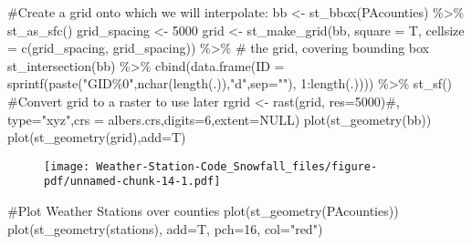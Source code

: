 \documentclass[
  letterpaper,
]{book}
\newenvironment{Shaded}{\begin{snugshade}}{\end{snugshade}}
\newcommand{\AttributeTok}[1]{\textcolor[rgb]{0.40,0.45,0.13}{#1}}
\newcommand{\CommentTok}[1]{\textcolor[rgb]{0.37,0.37,0.37}{#1}}
\newcommand{\DecValTok}[1]{\textcolor[rgb]{0.68,0.00,0.00}{#1}}
\newcommand{\FunctionTok}[1]{\textcolor[rgb]{0.28,0.35,0.67}{#1}}
\newcommand{\NormalTok}[1]{\textcolor[rgb]{0.00,0.23,0.31}{#1}}
\newcommand{\OtherTok}[1]{\textcolor[rgb]{0.00,0.23,0.31}{#1}}
\newcommand{\SpecialCharTok}[1]{\textcolor[rgb]{0.37,0.37,0.37}{#1}}
\newcommand{\StringTok}[1]{\textcolor[rgb]{0.13,0.47,0.30}{#1}}
\begin{document}
\begin{Shaded}
\begin{Highlighting}[]
\CommentTok{\#Create a grid onto which we will interpolate:}
\NormalTok{bb }\OtherTok{\textless{}{-}} \FunctionTok{st\_bbox}\NormalTok{(PAcounties) }\SpecialCharTok{\%\textgreater{}\%} \FunctionTok{st\_as\_sfc}\NormalTok{()}
\NormalTok{grid\_spacing }\OtherTok{\textless{}{-}} \DecValTok{5000}
\NormalTok{grid }\OtherTok{\textless{}{-}} \FunctionTok{st\_make\_grid}\NormalTok{(bb, }\AttributeTok{square =}\NormalTok{ T, }\AttributeTok{cellsize =} \FunctionTok{c}\NormalTok{(grid\_spacing, grid\_spacing)) }\SpecialCharTok{\%\textgreater{}\%} \CommentTok{\# the grid, covering bounding box}
  \FunctionTok{st\_intersection}\NormalTok{(bb) }\SpecialCharTok{\%\textgreater{}\%}
    \FunctionTok{cbind}\NormalTok{(}\FunctionTok{data.frame}\NormalTok{(}\AttributeTok{ID =} \FunctionTok{sprintf}\NormalTok{(}\FunctionTok{paste}\NormalTok{(}\StringTok{"GID\%0"}\NormalTok{,}\FunctionTok{nchar}\NormalTok{(}\FunctionTok{length}\NormalTok{(.)),}\StringTok{"d"}\NormalTok{,}\AttributeTok{sep=}\StringTok{""}\NormalTok{), }\DecValTok{1}\SpecialCharTok{:}\FunctionTok{length}\NormalTok{(.)))) }\SpecialCharTok{\%\textgreater{}\%}
    \FunctionTok{st\_sf}\NormalTok{()}
\CommentTok{\#Convert grid to a raster to use later}
\NormalTok{rgrid }\OtherTok{\textless{}{-}} \FunctionTok{rast}\NormalTok{(grid, }\AttributeTok{res=}\DecValTok{5000}\NormalTok{)}\CommentTok{\#, type="xyz",crs = albers.crs,digits=6,extent=NULL)}
\FunctionTok{plot}\NormalTok{(}\FunctionTok{st\_geometry}\NormalTok{(bb))}
\FunctionTok{plot}\NormalTok{(}\FunctionTok{st\_geometry}\NormalTok{(grid),}\AttributeTok{add=}\NormalTok{T)}
\end{Highlighting}
\end{Shaded}

\begin{figure}[H]

{\centering \texttt{[image: Weather-Station-Code\_Snowfall\_files/figure-pdf/unnamed-chunk-14-1.pdf]}

}

\end{figure}

\begin{Shaded}
\begin{Highlighting}[]
\CommentTok{\#Plot Weather Stations over counties}
\FunctionTok{plot}\NormalTok{(}\FunctionTok{st\_geometry}\NormalTok{(PAcounties))}
\FunctionTok{plot}\NormalTok{(}\FunctionTok{st\_geometry}\NormalTok{(stations), }\AttributeTok{add=}\NormalTok{T, }\AttributeTok{pch=}\DecValTok{16}\NormalTok{, }\AttributeTok{col=}\StringTok{"red"}\NormalTok{)}
\end{Highlighting}
\end{Shaded}
\end{document}
